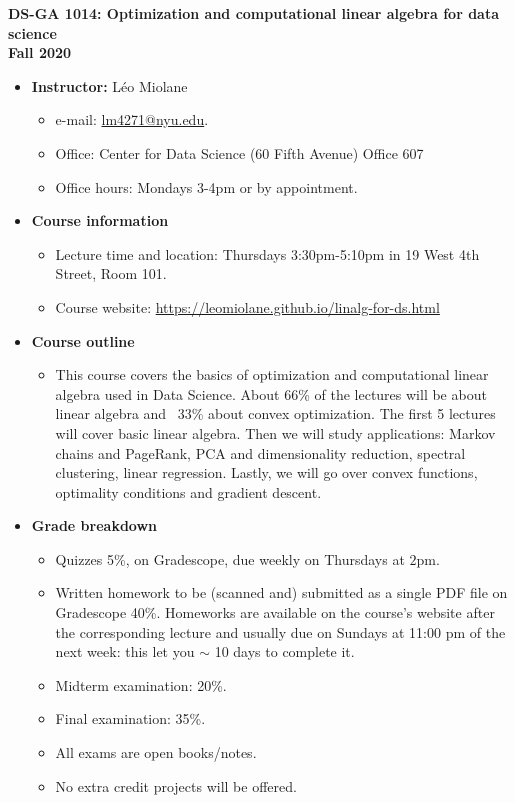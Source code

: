 \documentclass[11pt]{article}
\begin{document}
\begin{center}
	\textbf{\Large DS-GA 1014: Optimization and computational linear algebra for data science\\ \medskip Fall 2020}
\end{center}

\begin{itemize}
	\item \textbf{Instructor:} Léo Miolane
	\begin{itemize}
		\item e-mail: \url{lm4271@nyu.edu}. 
		\item Office: Center for Data Science (60 Fifth Avenue) Office 607 
		\item Office hours: Mondays 3-4pm or by appointment.
	\end{itemize}
	
	\item \textbf{Course information}
	\begin{itemize}
		\item Lecture time and location: Thursdays 3:30pm-5:10pm in 19 West 4th Street, Room 101.
		\item Course website: \url{https://leomiolane.github.io/linalg-for-ds.html}
	\end{itemize}
	
	\item \textbf{Course outline}
	\begin{itemize}
		\item This course covers the basics of optimization and computational linear algebra used in Data Science. About 66\% of the lectures will be about linear algebra and ~33\% about convex optimization. The first 5 lectures will cover basic linear algebra. Then we will study applications: Markov chains and PageRank, PCA and dimensionality reduction, spectral clustering, linear regression. Lastly, we will go over convex functions, optimality conditions and gradient descent.
	\end{itemize}
	
	\item \textbf{Grade breakdown}
	\begin{itemize}
		\item Quizzes 5\%, on Gradescope, due weekly on Thursdays at $2$pm.
		\item Written homework to be (scanned and) submitted as a single PDF file on Gradescope 40\%. Homeworks are available on the course's website after the corresponding lecture and usually due on Sundays at 11:00 pm of the next week: this let you $\sim$ 10 days to complete it.
		\item Midterm examination: 20\%. 
		\item Final examination: 35\%. 
		\item All exams are open books/notes.
		\item No extra credit projects will be offered.
	\end{itemize}
	

\end{itemize}
\end{document}
